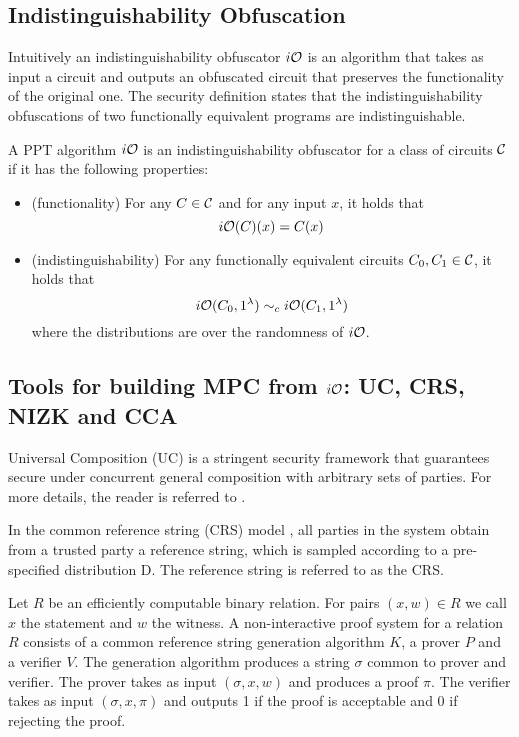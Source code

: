 \subsection{Indistinguishability Obfuscation}

Intuitively an indistinguishability obfuscator $i\mathcal{O}$ is an algorithm that takes as input a circuit and outputs an obfuscated circuit that preserves the functionality of the original one. The security definition states that the indistinguishability obfuscations of two functionally equivalent programs are indistinguishable.

\begin{mydef}
A PPT algorithm $i\mathcal{O}$ is an indistinguishability obfuscator for a class of circuits $\mathcal{C}$ if it has the following properties:
\begin{itemize}
\item (functionality) For any $C\in\mathcal{C}$ and for any input $x$, it holds that
\[
i\mathcal{O}(C)(x)=C(x)
\]
\item (indistinguishability) For any functionally equivalent circuits $C_0,C_1\in\mathcal{C}$, it holds that
\[
i\mathcal{O}(C_0,1^\lambda)\sim_c i\mathcal{O}(C_1,1^\lambda)
\]
where the distributions are over the randomness of $i\mathcal{O}$.
\end{itemize}
\end{mydef}

\subsection{Tools for building MPC from $i\mathcal{O}$: UC, CRS, NIZK and CCA}

Universal Composition (UC) \cite{canetti2001universally} is a stringent security framework that guarantees secure under concurrent general composition with arbitrary sets of parties. For more details, the reader is referred to \cite{canetti2001universally}.

In the common reference string (CRS) model \cite{canetti2001comm,canetti2002}, all parties in the system obtain from a trusted party a reference string, which is sampled according to a pre-specified distribution D. The reference string is referred to as the CRS.


Let $R$ be an efficiently computable binary relation. For pairs $(x, w) \in R$ we call $x$ the statement and $w$ the witness. A non-interactive proof system \cite{blum1988non} for a relation $R$ consists of a common reference string generation algorithm $K$, a prover $P$ and a verifier $V$. The generation algorithm produces a string $\sigma$ common to prover and verifier.
The prover takes as input $(\sigma, x, w)$ and produces a proof $\pi$. The verifier takes as input $(\sigma, x, \pi)$ and outputs 1 if the proof is acceptable and 0 if rejecting the proof.

